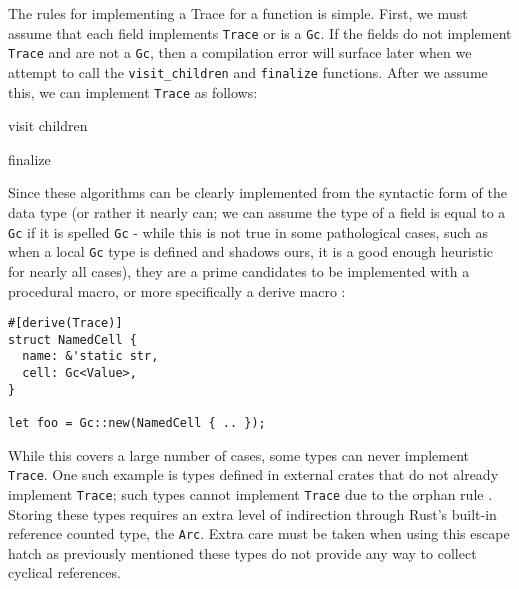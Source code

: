 \documentclass[sigplan]{acmart}
\begin{document}
The rules for implementing a Trace for a function is simple. First, we must
assume that each field implements \texttt{Trace} or is a \texttt{Gc}. If the
fields do not implement \texttt{Trace} and are not a \texttt{Gc}, then a
compilation error will surface later when we attempt to call the
\texttt{visit\_children} and \texttt{finalize} functions. After we assume this,
we can implement \texttt{Trace} as follows:

\begin{algorithm}
  \caption{visit children}\label{alg:cap}

\end{algorithm}

\begin{algorithm}
  \caption{finalize}\label{alg:cap}

\end{algorithm}

Since these algorithms can be clearly implemented from the syntactic form of the
data type (or rather it nearly can; we can assume the type of a field is equal to
a \texttt{Gc} if it is spelled \texttt{Gc} - while this is not true in some
pathological cases, such as when a local \texttt{Gc} type is defined and shadows
ours, it is a good enough heuristic for nearly all cases), they are a prime
candidates to be implemented with a procedural macro, or more specifically a
derive macro \cite{derive}:

\vfill\null

\begin{verbatim}
#[derive(Trace)]
struct NamedCell {
  name: &'static str,
  cell: Gc<Value>,
}

let foo = Gc::new(NamedCell { .. });
\end{verbatim}

While this covers a large number of cases, some types can never implement
\texttt{Trace}. One such example is types defined in external crates that do not
already implement \texttt{Trace}; such types cannot implement \texttt{Trace} due
to the orphan rule \cite{orphan}. Storing these types requires an extra level of
indirection through Rust's built-in reference counted type, the
\texttt{Arc}. Extra care must be taken when using this escape hatch as
previously mentioned these types do not provide any way to collect cyclical
references.
\end{document}
